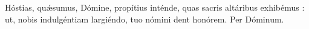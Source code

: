 Hóstias, quǽsumus, Dómine, pro\-pí\-tius inténde, quas sacris al\-tá\-ri\-bus exhibémus : ut, nobis in\-dul\-gén\-tiam largiéndo, tuo nó\-mi\-ni dent honórem. Per Dóminum.
